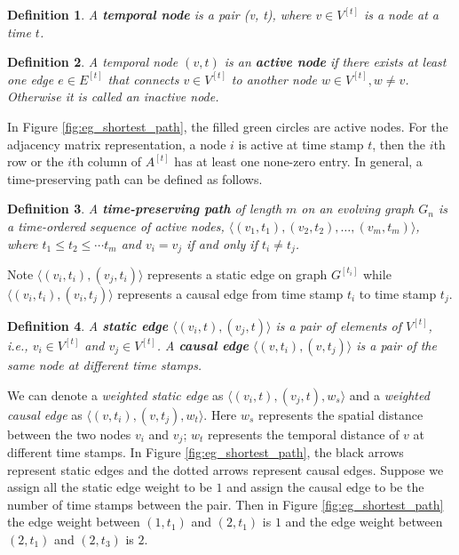 \documentclass[12pt]{article}
\newtheorem{definition}{Definition}
\theoremstyle{definition}
\begin{document}
\begin{definition}
  A \textbf{temporal node} is a pair (v, t), where $v \in V^{[t]}$ is a node at a time $t$.
\end{definition}


\begin{definition}
  A temporal node $(v, t)$ is an \textbf{active node} if there exists at least one edge $e \in E^{[t]}$ that connects $v \in V^{[t]}$ to another node $w \in V^{[t]}, w\ne v$. Otherwise it is called an inactive node.
\end{definition}

In Figure \ref{fig:eg_shortest_path}, the filled green circles are active nodes. For the adjacency matrix representation, a node $i$ is active at time stamp $t$, then
the $i$th row or the $i$th column of $A^{[t]}$ has at least one none-zero entry.
 In general, a time-preserving path can be defined as follows.

\begin{definition}
A \textbf{time-preserving path}  of length $m$ on an evolving graph $G_n$ is a time-ordered sequence of active nodes, $\langle (v_1, t_1), (v_2, t_2), \ldots, (v_m, t_m) \rangle$, where $t_1 \le t_2 \le \cdots t_m$ and 
$v_i = v_j$ if and only if $t_i \ne t_j$.
\end{definition}

Note $\langle (v_i, t_i), (v_j, t_i) \rangle$ represents a static edge on graph $G^{[t_i]}$ while $\langle (v_i, t_i), (v_i, t_j) \rangle$ represents a causal edge from time stamp $t_i$ to time stamp $t_j$.

\begin{definition}
A \textbf{static edge} $\langle (v_i, t), (v_j, t)\rangle$ is a pair of elements of $V^{[t]}$, i.e., $v_i \in V^{[t]}$ and 
$v_j \in V^{[t]}$.
 A \textbf{causal edge} $\langle (v, t_i), (v, t_j)\rangle$ is a pair of the same node at different time stamps. 
\end{definition}

We can denote a \emph{weighted static edge} as $\langle (v_i, t), (v_j, t), w_s \rangle$ and a \emph{weighted causal edge} as $\langle (v, t_i), (v, t_j), w_t \rangle$.
Here $w_s$ represents the spatial distance between the two nodes $v_i$ and $v_j$; $w_t$ represents the 
temporal distance of $v$ at different time stamps. 
In Figure \ref{fig:eg_shortest_path}, the black arrows represent static edges and the dotted arrows represent causal edges.
Suppose we assign all the static edge weight to be $1$ and
assign the causal edge to be the number of time stamps between the pair. Then in Figure \ref{fig:eg_shortest_path}
the edge weight between $(1, t_1)$ and $(2, t_1)$ is $1$ and the edge weight between $(2, t_1)$ and $(2, t_3)$
 is $2$. 
\end{document}
